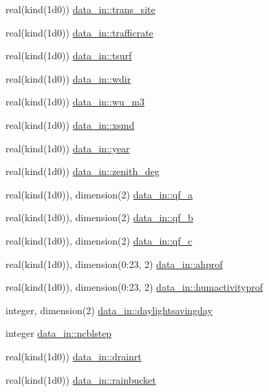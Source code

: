 \begin{DoxyCompactItemize}
\item 
real(kind(1d0)) \hyperlink{namespacedata__in_a9c53dc9992f8f407198edbaea657599a}{data\+\_\+in\+::trans\+\_\+site}
\item 
real(kind(1d0)) \hyperlink{namespacedata__in_aba0ff641b30b686cf5afdd358761c586}{data\+\_\+in\+::trafficrate}
\item 
real(kind(1d0)) \hyperlink{namespacedata__in_a743440f75d11d6596e13e18b78d7f531}{data\+\_\+in\+::tsurf}
\item 
real(kind(1d0)) \hyperlink{namespacedata__in_a42491a5943973e024de52949b4cdaa53}{data\+\_\+in\+::wdir}
\item 
real(kind(1d0)) \hyperlink{namespacedata__in_ae8c7901bd4995fbdec3868c38d2101b1}{data\+\_\+in\+::wu\+\_\+m3}
\item 
real(kind(1d0)) \hyperlink{namespacedata__in_a22f13004f0c25b6603cceb88897eaee5}{data\+\_\+in\+::xsmd}
\item 
real(kind(1d0)) \hyperlink{namespacedata__in_a491ee3189141ae36fd29fde5cc020b53}{data\+\_\+in\+::year}
\item 
real(kind(1d0)) \hyperlink{namespacedata__in_a332530944dd5c37316f92c3c74350e83}{data\+\_\+in\+::zenith\+\_\+deg}
\item 
real(kind(1d0)), dimension(2) \hyperlink{namespacedata__in_a44d4947885c1f0f8cd0924c7147d084b}{data\+\_\+in\+::qf\+\_\+a}
\item 
real(kind(1d0)), dimension(2) \hyperlink{namespacedata__in_ac8582577b56253d36f68dcc213c7bfa4}{data\+\_\+in\+::qf\+\_\+b}
\item 
real(kind(1d0)), dimension(2) \hyperlink{namespacedata__in_aac91e60fdee7233d397c1fdbfcd65505}{data\+\_\+in\+::qf\+\_\+c}
\item 
real(kind(1d0)), dimension(0\+:23, 2) \hyperlink{namespacedata__in_adacab1a738e29a24443b23231bf40111}{data\+\_\+in\+::ahprof}
\item 
real(kind(1d0)), dimension(0\+:23, 2) \hyperlink{namespacedata__in_a3cb096487decd1f0cec9c289cba1eae6}{data\+\_\+in\+::humactivityprof}
\item 
integer, dimension(2) \hyperlink{namespacedata__in_a0aac3556805fc05672641d8bb59558e2}{data\+\_\+in\+::daylightsavingday}
\item 
integer \hyperlink{namespacedata__in_ad8e5dc33bb1aacb37406f71ac93929ba}{data\+\_\+in\+::ncblstep}
\item 
real(kind(1d0)) \hyperlink{namespacedata__in_abc838b310998f8cef4246fd9d724e903}{data\+\_\+in\+::drainrt}
\item 
real(kind(1d0)) \hyperlink{namespacedata__in_a959499405172092dfb8d49b61bfec809}{data\+\_\+in\+::rainbucket}

\end{DoxyCompactItemize}
